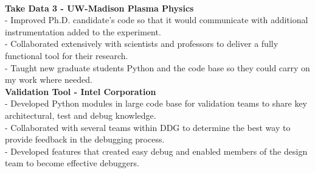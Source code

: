 \documentclass{resume}
\begin{document}
\begin{flushleft}
 \\[2mm]
\textbf{Take Data 3 - UW-Madison Plasma Physics} \\%
{\footnotesize
	\ttab- Improved Ph.D. candidate's code so that it would communicate with additional instrumentation added to the experiment. \\
	\ttab - Collaborated extensively with scientists and professors to deliver a fully functional tool for their research. \\
	\ttab - Taught new graduate students Python and the code base so they could carry on my work where needed. 
}
\\[2mm]
\textbf{Validation Tool - Intel Corporation} \\
{\footnotesize
	\ttab- Developed Python modules in large code base for validation teams to share key architectural, test and debug knowledge. \\
	\ttab- Collaborated with several teams within DDG to determine the best way to provide feedback in the debugging process. \\
	\ttab -  Developed features that created easy debug and enabled members of the design team to become effective debuggers. \\[4mm]
}



\end{flushleft}
\end{document}
